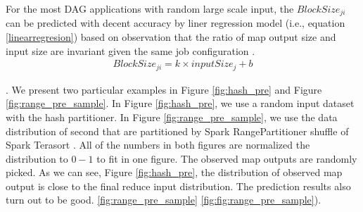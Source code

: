 For the most DAG applications with random large scale input, 
the $BlockSize_{ji}$ can be predicted with decent accuracy by liner regression model (i.e., equation \ref{linearregresion}) based on observation that the ratio of map output size and input size are invariant given the same job configuration \cite{ishuffle, predict}.
\begin{equation}
\label{linearregresion}
\begin{aligned}
	BlockSize_{ji} = k \times inputSize_j + b
\end{aligned}
\end{equation}

 \cite{apachespark}.  
\ifrevision
\reversemarginpar
{}
\fi
We present two particular examples in Figure \ref{fig:hash_pre} and Figure \ref{fig:range_pre_sample}. 
In Figure \ref{fig:hash_pre}, we use a random input dataset with the hash partitioner. 
In Figure \ref{fig:range_pre_sample}, we use the data distribution of second that are partitioned by Spark RangePartitioner \cite{apachespark} shuffle of Spark Terasort \cite{spark-tera}. 
All of the numbers in both figures are normalized the distribution to $0-1$ to fit in one figure. 
The observed map outputs are randomly picked. 
As we can see, Figure \ref{fig:hash_pre}, the distribution of observed map output is close to the final reduce input distribution. 
The prediction results also turn out to be good. 
 \ref{fig:range_pre_sample}  \ref{fig:fig:range_pre_sample}).

